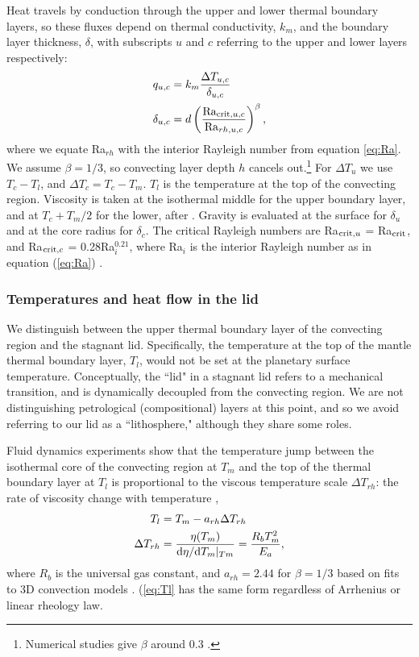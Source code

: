Heat travels by conduction through the upper and lower thermal boundary layers, so these fluxes depend on thermal conductivity, $k_m$, and the boundary layer thickness, $\delta$, with subscripts $u$ and $c$ referring to the upper and lower layers respectively: 
\begin{align}
q_{u, c} &= k_m \frac{\Delta T_{u, c}}{\delta_{u, c}} \label{eq:q_u}\\
\delta_{u, c} &= d \left(\frac{{\rm Ra}_{{\rm crit}, u, c}}{{\rm Ra}_{rh, u, c}}\right)^\beta,\label{eq:d_u}
\end{align}
where we equate Ra$_{rh}$ with the interior Rayleigh number from equation \ref{eq:Ra}. We assume $\beta = 1/3$, so convecting layer depth $h$ cancels out.\footnote{Numerical studies give $\beta$ around 0.3 \citep{Thiriet2019}.} For $\Delta T_u$ we use $T_c - T_l$, and $\Delta T_c = T_c - T_m$. $T_l$ is the temperature at the top of the convecting region. Viscosity is taken at the isothermal middle for the upper boundary layer, and at $T_c + T_m/2$ for the lower, after \citet{Thiriet2019}. Gravity is evaluated at the surface for $\delta_u$ and at the core radius for $\delta_c$. The critical Rayleigh numbers are Ra$_{{\rm crit}, u}$ = Ra$_{{\rm crit}}$, and Ra$_{{\rm crit}, c}$ = 0.28Ra$_{i}^{0.21}$, where Ra$_{i}$ is the interior Rayleigh number as in equation (\ref{eq:Ra}) \citep{Thiriet2019}.




\subsubsection{Temperatures and heat flow in the lid}

We distinguish between the upper thermal boundary layer of the convecting region and the stagnant lid. Specifically, the temperature at the top of the mantle thermal boundary layer, $T_l$, would not be set at the planetary surface temperature. Conceptually, the ``lid" in a stagnant lid refers to a mechanical transition, and is dynamically decoupled from the convecting region. We are not distinguishing petrological (compositional) layers at this point, and so we avoid referring to our lid as a ``lithosphere," although they share some roles.

Fluid dynamics experiments show that the temperature jump between the isothermal core of the convecting region at $T_m$ and the top of the thermal boundary layer at $T_l$ is proportional to the viscous temperature scale $\Delta T_{rh}$: the rate of viscosity change with temperature \citep{Davaille1993},
\begin{align}
\label{eq:Tl}
T_{l} &= T_m - a_{rh} \Delta T_{rh} \\
\Delta T_{rh} &= \frac{\eta(T_m)}{{\rm d}\eta/{\rm d}T_m\vert_{Tm}} = \frac{R_b T_m^2}{E_a},
\end{align}
where $R_b$ is the universal gas constant, and $a_{rh} = 2.44$ for $\beta = 1/3$ based on fits to 3D convection models \citep{Thiriet2019}. (\ref{eq:Tl} has the same form regardless of Arrhenius or linear rheology law. 



